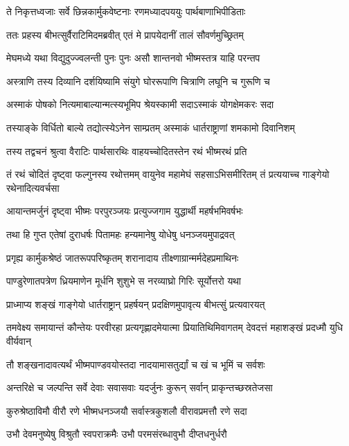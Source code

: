 \twolineshloka
{ते निकृत्तध्वजाः सर्वे छिन्नकार्मुकवेष्टनाः}
{रणमध्यादपययुः पार्थबाणाभिपीडिताः}


\twolineshloka
{ततः प्रहस्य बीभत्सुर्वैराटिमिदमब्रवीत्}
{एतं मे प्रापयेदानीं तालं सौवर्णमुच्छ्रितम्}


\twolineshloka
{मेघमध्ये यथा विद्युदुज्ज्वलन्ती पुनः पुनः}
{असौ शान्तनवो भीष्मस्तत्र याहि परन्तप}


\twolineshloka
{अस्त्राणि तस्य दिव्यानि दर्शयिष्यामि संयुगे}
{घोररूपाणि चित्राणि लघूनि च गुरूणि च}


\twolineshloka
{अस्माकं पोषको नित्यमाबाल्यान्मत्स्यभूमिप}
{श्रेयस्कामी सदाऽस्माकं योगक्षेमकरः सदा}


\twolineshloka
{तस्याङ्के विर्धितो बाल्ये तद्योत्स्येऽनेन साम्प्रतम्}
{अस्माकं धार्तराष्ट्राणां शमकामो दिवानिशम्}



\twolineshloka
{तस्य तद्वचनं श्रुत्वा वैराटिः पार्थसारथिः}
{वाहयच्चोदितस्तेन रथं भीष्मरथं प्रति}


\threelineshloka
{तं रथं चोदितं दृष्ट्वा फल्गुनस्य रथोत्तमम्}
{वायुनेव महामेघं सहसाऽभिसमीरितम्}
{तं प्रत्ययाच्च गाङ्गेयो रथेनादित्यवर्चसा}


\twolineshloka
{आयान्तमर्जुनं दृष्ट्वा भीष्मः परपुरञ्जयः}
{प्रत्युज्जगाम युद्धार्थी महर्षभमिवर्षभः}


\twolineshloka
{तथा हि गुप्त एतेषां दुराधर्षः पितामहः}
{हन्यमानेषु योधेषु धनञ्जयमुपाद्रवत्}


\twolineshloka
{प्रगृह्य कार्मुकश्रेष्ठं जातरूपपरिष्कृतम्}
{शरानादाय तीक्ष्णाग्रान्मर्मदेहप्रमाथिनः}


\twolineshloka
{पाण्डुरेणातपत्रेण ध्रियमाणेन मूर्धनि}
{शुशुभे स नरव्याघ्रो गिरिः सूर्योत्तरो यथा}


\twolineshloka
{प्राध्माप्य शङ्खं गाङ्गेयो धार्तराष्ट्रान् प्रहर्षयन्}
{प्रदक्षिणमुपावृत्य बीभत्सुं प्रत्यवारयत्}


\threelineshloka
{तमवेक्ष्य समायान्तं कौन्तेयः परवीरहा}
{प्रत्यगृह्णादमेयात्मा प्रियातिथिमिवागतम्}
{देवदत्तं महाशङ्खं प्रदध्मौ युधि वीर्यवान्}


\twolineshloka
{तौ शङ्खनादावत्यर्थं भीष्मपाण्डवयोस्तदा}
{नादयामासतुर्द्यां च खं च भूमिं च सर्वशः}


\twolineshloka
{अन्तरिक्षे च जल्पन्ति सर्वे देवाः सवासवाः}
{यदर्जुनः कुरून् सर्वान् प्राकृन्तच्छस्रतेजसा}


\twolineshloka
{कुरुश्रेष्ठाविमौ वीरौ रणे भीष्मधनञ्जयौ}
{सर्वास्त्रकुशलौ वीरावप्रमत्तौ रणे सदा}


\twolineshloka
{उभौ देवमनुष्येषु विश्रुतौ स्वपराक्रमैः}
{उभौ परमसंरब्धावुभौ दीप्तधनुर्धरौ}


